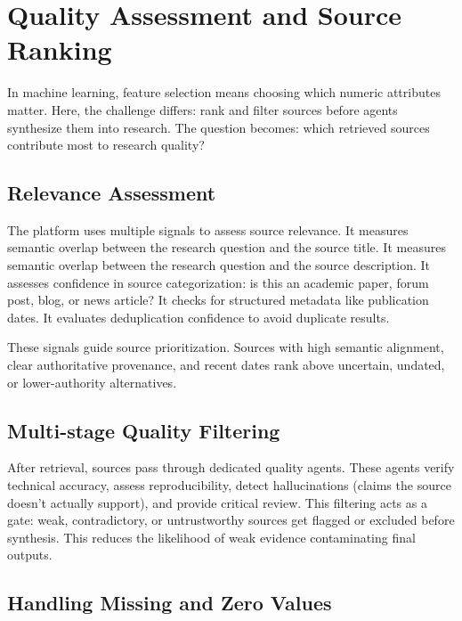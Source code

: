 \documentclass[12pt, a4paper]{article}
\begin{document}
\section{Quality Assessment and Source Ranking}

In machine learning, feature selection means choosing which numeric attributes matter. Here, the challenge differs: rank and filter sources before agents synthesize them into research. The question becomes: which retrieved sources contribute most to research quality?

\subsection{Relevance Assessment}

The platform uses multiple signals to assess source relevance. It measures semantic overlap between the research question and the source title. It measures semantic overlap between the research question and the source description. It assesses confidence in source categorization: is this an academic paper, forum post, blog, or news article? It checks for structured metadata like publication dates. It evaluates deduplication confidence to avoid duplicate results.

These signals guide source prioritization. Sources with high semantic alignment, clear authoritative provenance, and recent dates rank above uncertain, undated, or lower-authority alternatives.

\subsection{Multi-stage Quality Filtering}

After retrieval, sources pass through dedicated quality agents. These agents verify technical accuracy, assess reproducibility, detect hallucinations (claims the source doesn't actually support), and provide critical review. This filtering acts as a gate: weak, contradictory, or untrustworthy sources get flagged or excluded before synthesis. This reduces the likelihood of weak evidence contaminating final outputs.

\subsection{Handling Missing and Zero Values}
\end{document}
